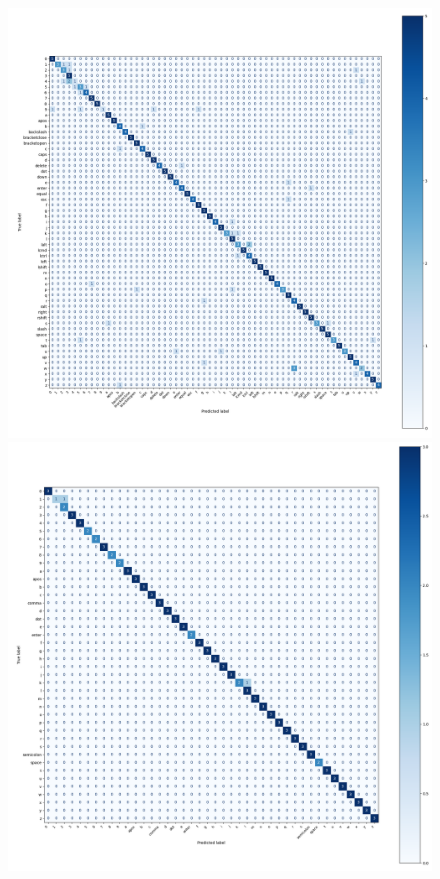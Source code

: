 \documentclass[a4paper,11pt,twoside]{report}
\theoremstyle{definition}
\begin{document}
\begin{figure}[H]
  \centering
    \begin{minipage}{0.49\linewidth}
      \centering
      \includegraphics[width=\linewidth]{img_appendix/cm_all_all_mka.png}
  \end{minipage}
  \begin{minipage}{0.49\linewidth}
      \centering
      \includegraphics[width=\linewidth]{img_appendix/cm_all_all_n.png}

\end{minipage}
\end{figure}
\end{document}
